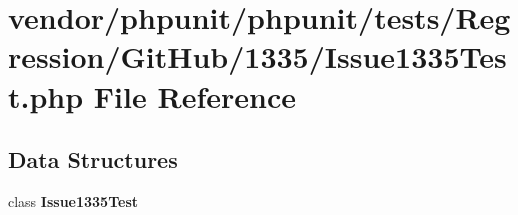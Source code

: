 \section{vendor/phpunit/phpunit/tests/\+Regression/\+Git\+Hub/1335/\+Issue1335\+Test.php File Reference}
\label{_issue1335_test_8php}
\subsection*{Data Structures}
\begin{DoxyCompactItemize}
\item 
class {\bf Issue1335\+Test}
\end{DoxyCompactItemize}
